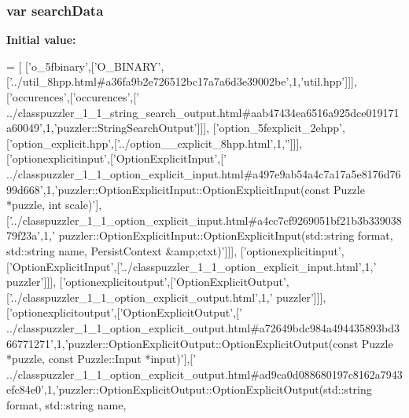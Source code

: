 \subsubsection[{search\+Data}]{\setlength{\rightskip}{0pt plus 5cm}var search\+Data}\label{a00057_ad01a7523f103d6242ef9b0451861231e}
{\bfseries Initial value\+:}
\begin{DoxyCode}
=
[
  [\textcolor{stringliteral}{'o\_5fbinary'},[\textcolor{stringliteral}{'O\_BINARY'},[\textcolor{stringliteral}{'../util\_8hpp.html#a36fa9b2e726512bc17a7a6d3e39002be'},1,\textcolor{stringliteral}{'util.hpp'}]]],
  [\textcolor{stringliteral}{'occurences'},[\textcolor{stringliteral}{'occurences'},[\textcolor{stringliteral}{'
      ../classpuzzler\_1\_1\_string\_search\_output.html#aab47434ea6516a925dce019171a60049'},1,\textcolor{stringliteral}{'puzzler::StringSearchOutput'}]]],
  [\textcolor{stringliteral}{'option\_5fexplicit\_2ehpp'},[\textcolor{stringliteral}{'option\_explicit.hpp'},[\textcolor{stringliteral}{'../option\_\_explicit\_8hpp.html'},1,\textcolor{stringliteral}{''}]]],
  [\textcolor{stringliteral}{'optionexplicitinput'},[\textcolor{stringliteral}{'OptionExplicitInput'},[\textcolor{stringliteral}{'
      ../classpuzzler\_1\_1\_option\_explicit\_input.html#a497e9ab54a4c7a17a5e8176d7699d668'},1,\textcolor{stringliteral}{'puzzler::OptionExplicitInput::OptionExplicitInput(const Puzzle *puzzle, int
       scale)'}],[\textcolor{stringliteral}{'../classpuzzler\_1\_1\_option\_explicit\_input.html#a4cc7cf9269051bf21b3b33903879f23a'},1,\textcolor{stringliteral}{'
      puzzler::OptionExplicitInput::OptionExplicitInput(std::string format, std::string name, PersistContext &amp;ctxt)'}]]],
  [\textcolor{stringliteral}{'optionexplicitinput'},[\textcolor{stringliteral}{'OptionExplicitInput'},[\textcolor{stringliteral}{'../classpuzzler\_1\_1\_option\_explicit\_input.html'},1,\textcolor{stringliteral}{'
      puzzler'}]]],
  [\textcolor{stringliteral}{'optionexplicitoutput'},[\textcolor{stringliteral}{'OptionExplicitOutput'},[\textcolor{stringliteral}{'../classpuzzler\_1\_1\_option\_explicit\_output.html'},1,\textcolor{stringliteral}{'
      puzzler'}]]],
  [\textcolor{stringliteral}{'optionexplicitoutput'},[\textcolor{stringliteral}{'OptionExplicitOutput'},[\textcolor{stringliteral}{'
      ../classpuzzler\_1\_1\_option\_explicit\_output.html#a72649bdc984a494435893bd366771271'},1,\textcolor{stringliteral}{'puzzler::OptionExplicitOutput::OptionExplicitOutput(const Puzzle *puzzle,
       const Puzzle::Input *input)'}],[\textcolor{stringliteral}{'
      ../classpuzzler\_1\_1\_option\_explicit\_output.html#ad9ca0d088680197c8162a7943efc84e0'},1,\textcolor{stringliteral}{'puzzler::OptionExplicitOutput::OptionExplicitOutput(std::string format, std::string name,
}
\end{DoxyCode}
